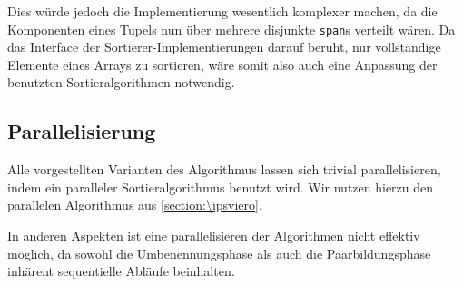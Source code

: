 Dies würde jedoch die Implementierung wesentlich komplexer machen, da die Komponenten eines Tupels nun über mehrere disjunkte \texttt{span}s verteilt wären. Da das Interface der Sortierer-Implementierungen darauf beruht, nur vollständige Elemente eines Arrays zu sortieren, wäre somit also auch eine Anpassung der benutzten Sortieralgorithmen notwendig.

\subsection{Parallelisierung}
\label{chapter:saca:doubling:par}

Alle vorgestellten Varianten des Algorithmus lassen sich trivial parallelisieren, indem ein paralleler Sortieralgorithmus benutzt wird. Wir nutzen hierzu den parallelen \ipsviero Algorithmus aus \cref{section:\ipsviero}.

In anderen Aspekten ist eine parallelisieren der Algorithmen nicht effektiv möglich, da sowohl die Umbenennungsphase als auch die Paarbildungsphase inhärent sequentielle Abläufe beinhalten.
